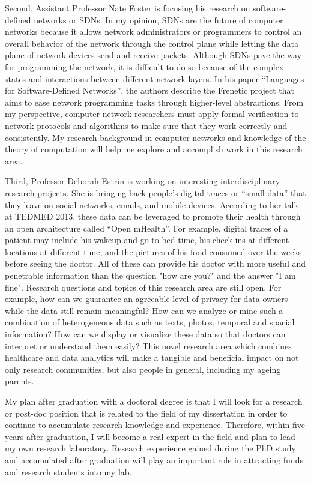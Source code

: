 \documentclass[a4paper,10pt]{report}
\begin{document}
\vspace{0.2cm}
Second, Assistant Professor Nate Foster is focusing his research on software-defined networks or SDNs. In my opinion, SDNs are the future of computer networks because it allows network administrators or programmers to control an overall behavior of the network through the control plane while letting the data plane of network devices send and receive packets. Although SDNs pave the way for programming the network, it is difficult to do so because of the complex states and interactions between different network layers. In his paper ``Languages for Software-Defined Networks'', the authors describe the Frenetic project that aims to ease network programming tasks through higher-level abstractions. From my perspective, computer network researchers must apply formal verification to network protocols and algorithms to make sure that they work correctly and consistently. My research background in computer networks and knowledge of the theory of computation will help me explore and accomplish work in this research area.

\vspace{0.2cm}
Third, Professor Deborah Estrin is working on interesting interdisciplinary research projects. She is bringing back people's digital traces or ``small data'' that they leave on social networks, emails, and mobile devices. According to her talk at TEDMED 2013, these data can be leveraged to promote their health through an open architecture called ``Open mHealth''. For example, digital traces of a patient may include his wakeup and go-to-bed time, his check-ins at different locations at different time, and the pictures of his food consumed over the weeks before seeing the doctor. All of these can provide his doctor with more useful and penetrable information than the question "how are you?" and the answer "I am fine". Research questions and topics of this research area are still open. For example, how can we guarantee an agreeable level of privacy for data owners while the data still remain meaningful? How can we analyze or mine such a combination of heterogeneous data such as texts, photos, temporal and spacial information? How can we display or visualize these data so that doctors can interpret or understand them easily? This novel research area which combines  healthcare and data analytics will make a tangible and beneficial impact on not only research communities, but also people in general, including my ageing parents.

\vspace{0.2cm}
My plan after graduation with a doctoral degree is that I will look for a research or post-doc position that is related to the field of my dissertation in order to continue to accumulate research knowledge and experience. Therefore, within five years after graduation, I will become a real expert in the field and plan to lead my own research laboratory. Research experience gained during the PhD study and accumulated after graduation will play an important role in attracting funds and research students into my lab.
\end{document}
